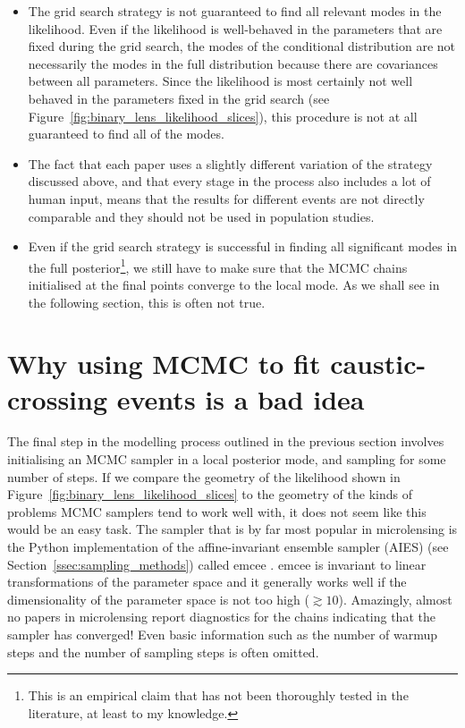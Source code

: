 \documentclass[12pt,dvipsnames]{report}
\newcommand{\ssf}[1]{\textsf{#1}}
\begin{document}
\begin{itemize}
\item The grid search strategy is not guaranteed to find all relevant modes in the likelihood. 
Even if the likelihood is well-behaved in the parameters that are fixed during the grid search, 
the modes of the conditional distribution are not necessarily the modes 
in the full distribution because there are covariances between all parameters. Since 
the likelihood is most certainly not well behaved in the parameters fixed in the grid
search (see Figure~\ref{fig:binary_lens_likelihood_slices}), this procedure is not 
at all guaranteed to find all of the modes.
\item The fact that each paper uses a slightly different variation of the strategy discussed 
above, and that every stage in the process also includes a lot of human input, means that the 
results for different events are not directly comparable and they should not be used in 
population studies.
\item Even if the grid search strategy is successful in finding all significant modes in the full 
posterior\footnote{This is an empirical claim that has not been thoroughly 
tested in the literature, at least to my knowledge.}, we still have to make sure that 
the MCMC chains initialised at the final points converge to the local mode. As we shall see 
in the following section, this is often not true.
\end{itemize}

\section{Why using MCMC to fit caustic-crossing events is a bad idea}
The final step in the modelling process outlined in the previous section involves initialising
an MCMC sampler in a local posterior mode, and sampling for some number of steps. 
If we compare the geometry of the likelihood shown in Figure~\ref{fig:binary_lens_likelihood_slices}
to the geometry of the kinds of problems MCMC samplers tend to work well with, it does not 
seem like this would be an easy task. The sampler that is by far most popular in microlensing 
is the \ssf{Python} implementation of the affine-invariant ensemble sampler (AIES) (see 
Section~\ref{ssec:sampling_methods}) called \ssf{emcee} \citep{2013PASP..125..306F}.
\ssf{emcee} is invariant to linear transformations of the parameter space and it generally 
works well if the dimensionality of the parameter space is not too high ($\gtrsim 10$). 
Amazingly, almost no papers in microlensing report diagnostics for the chains indicating 
that the sampler has converged! Even basic information such as the number of warmup steps and 
the number of sampling steps is often omitted.
\end{document}
